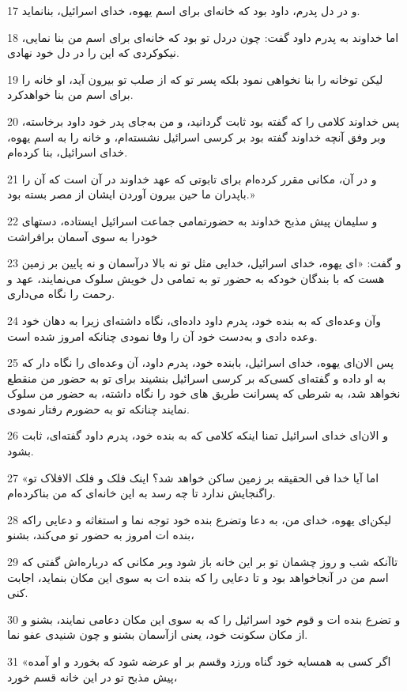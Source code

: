 \par 17 و در دل پدرم، داود بود که خانه‌ای برای اسم یهوه، خدای اسرائیل، بنانماید.
\par 18 اما خداوند به پدرم داود گفت: چون دردل تو بود که خانه‌ای برای اسم من بنا نمایی، نیکوکردی که این را در دل خود نهادی.
\par 19 لیکن توخانه را بنا نخواهی نمود بلکه پسر تو که از صلب تو بیرون آید، او خانه را برای اسم من بنا خواهدکرد.
\par 20 پس خداوند کلامی را که گفته بود ثابت گردانید، و من به‌جای پدر خود داود برخاسته، وبر وفق آنچه خداوند گفته بود بر کرسی اسرائیل نشسته‌ام، و خانه را به اسم یهوه، خدای اسرائیل، بنا کرده‌ام.
\par 21 و در آن، مکانی مقرر کرده‌ام برای تابوتی که عهد خداوند در آن است که آن را باپدران ما حین بیرون آوردن ایشان از مصر بسته بود.»
\par 22 و سلیمان پیش مذبح خداوند به حضورتمامی جماعت اسرائیل ایستاده، دستهای خودرا به سوی آسمان برافراشت
\par 23 و گفت: «ای یهوه، خدای اسرائیل، خدایی مثل تو نه بالا درآسمان و نه پایین بر زمین هست که با بندگان خودکه به حضور تو به تمامی دل خویش سلوک می‌نمایند، عهد و رحمت را نگاه می‌داری.
\par 24 وآن وعده‌ای که به بنده خود، پدرم داود داده‌ای، نگاه داشته‌ای زیرا به دهان خود وعده دادی و به‌دست خود آن را وفا نمودی چنانکه امروز شده است.
\par 25 پس الان‌ای یهوه، خدای اسرائیل، بابنده خود، پدرم داود، آن وعده‌ای را نگاه دار که به او داده و گفته‌ای کسی‌که بر کرسی اسرائیل بنشیند برای تو به حضور من منقطع نخواهد شد، به شرطی که پسرانت طریق های خود را نگاه داشته، به حضور من سلوک نمایند چنانکه تو به حضورم رفتار نمودی.
\par 26 و الان‌ای خدای اسرائیل تمنا اینکه کلامی که به بنده خود، پدرم داود گفته‌ای، ثابت بشود.
\par 27 «اما آیا خدا فی الحقیقه بر زمین ساکن خواهد شد؟ اینک فلک و فلک الافلاک تو راگنجایش ندارد تا چه رسد به این خانه‌ای که من بناکرده‌ام.
\par 28 لیکن‌ای یهوه، خدای من، به دعا وتضرع بنده خود توجه نما و استغاثه و دعایی راکه بنده ات امروز به حضور تو می‌کند، بشنو،
\par 29 تاآنکه شب و روز چشمان تو بر این خانه باز شود وبر مکانی که درباره‌اش گفتی که اسم من در آنجاخواهد بود و تا دعایی را که بنده ات به سوی این مکان بنماید، اجابت کنی.
\par 30 و تضرع بنده ات و قوم خود اسرائیل را که به سوی این مکان دعامی نمایند، بشنو و از مکان سکونت خود، یعنی ازآسمان بشنو و چون شنیدی عفو نما.
\par 31 «اگر کسی به همسایه خود گناه ورزد وقسم بر او عرضه شود که بخورد و او آمده پیش مذبح تو در این خانه قسم خورد،
